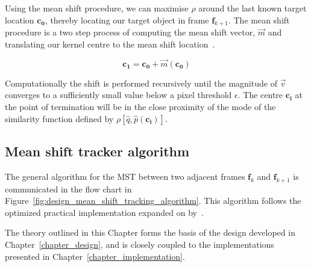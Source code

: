 Using the mean shift procedure, we can maximise $\rho$ around the
last known target location $\mathbf{c_0}$, thereby locating our target object in frame $\mathbf{f}_{k+1}$. 
The mean shift procedure is a two step process of computing the mean shift
vector, $\vec{m}$ and translating our kernel centre to the mean shift location~\cite{Comaniciu2002}. 

\begin{equation}\label{eqn:mean_shift_procedure}
    \mathbf{c_1} = \mathbf{c_0} + \vec{m}(\mathbf{c_0})
\end{equation}

Computationally the shift is performed recursively until the magnitude of $\vec{v}$ converges
to a sufficiently small value below a pixel threshold $\epsilon$. The centre
$\mathbf{c_i}$ at the point of termination will be in the close proximity of the
mode of the similarity function defined by $\rho[\hat{q},\hat{p}(\mathbf{c_i})]$.

\subsection{Mean shift tracker algorithm}\label{theoretical_framework_mean_shift_algorithm}
The general algorithm for the MST between two adjacent frames $\mathbf{f}_k$ and
$\mathbf{f}_{k+1}$ is communicated in the flow chart in
Figure~\ref{fig:design_mean_shift_tracking_algorithm}. This algorithm follows
the optimized practical implementation expanded on by~\cite{Comaniciu2003}. 


The theory outlined in this Chapter forms the basis of the design developed in
Chapter~\ref{chapter_design}, and is closely coupled to the implementations
presented in Chapter~\ref{chapter_implementation}.

